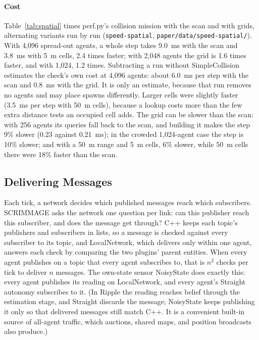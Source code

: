 \documentclass[conference]{IEEEtran}
\begin{document}
\paragraph{Cost}
Table~\ref{tab:spatial} times perf.py's collision mission with the scan and
with grids, alternating variants run by run (\texttt{speed-spatial},
\texttt{paper/data/speed-spatial/}). With 4{,}096 spread-out agents, a whole step takes 9.0~ms with the scan
and 3.8~ms with 5~m cells, 2.4 times faster; with 2{,}048 agents the grid is
1.6 times faster, and with 1{,}024, 1.2 times. Subtracting a run without
SimpleCollision estimates the check's own cost at 4{,}096 agents: about 6.0~ms
per step with the scan and 0.8~ms with the grid. It is only an estimate,
because that run removes no agents and may place spawns differently. Larger
cells were slightly faster (3.5~ms per step with 50~m cells), because a lookup
costs more than the few extra distance tests an occupied cell adds. The grid
can be slower than the scan: with 256 agents its queries fall back to the scan,
and building it makes the step 9\% slower (0.23 against 0.21~ms); in the
crowded 1{,}024-agent case the step is 10\% slower; and with a 50~m range and
5~m cells, 6\% slower, while 50~m cells there were 18\% faster than the scan.


\subsection{Delivering Messages}
\label{sec:messages}

Each tick, a network decides which published messages reach which subscribers.
SCRIMMAGE asks the network one question per link: can this publisher reach this
subscriber, and does the message get through? C++ keeps each topic's publishers
and subscribers in lists, so a message is checked against every subscriber to
its topic, and LocalNetwork, which delivers only within one agent, answers each
check by comparing the two plugins' parent entities. When every agent publishes
on a topic that every agent subscribes to, that is $n^2$ checks per tick to
deliver $n$ messages. The own-state sensor NoisyState does exactly this: every
agent publishes its reading on LocalNetwork, and every agent's Straight
autonomy subscribes to it. (In Ripple the reading reaches belief through
the estimation stage, and Straight discards the message; NoisyState keeps
publishing it only so that delivered messages still match C++. It is a
convenient built-in source of all-agent traffic, which auctions, shared maps,
and position broadcasts also produce.)
\end{document}
